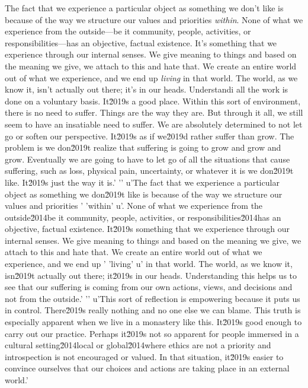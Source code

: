 The fact that we experience a particular object as something we don't 
like is because of the way we structure our values and priorities 
\emph{within}. None of what we experience from the outside---be it 
community, people, activities, or responsibilities---has an objective, 
factual existence. It's something that we experience through our 
internal senses. We give meaning to things and based on the meaning we 
give, we attach to this and hate that. We create an entire world out of 
what we experience, and we end up \emph{living} in that world. The 
world, as we know it, isn't actually out there; it's in our heads. 
Understandi all the work is done on a voluntary basis. It\u2019s a good place. Within this sort of environment, there is no need to suffer. Things are the way they are. But through it all, we still seem to have an insatiable need to suffer. We are absolutely determined to not let go or soften our perspective. It\u2019s as if we\u2019d rather suffer than grow. The problem is we don\u2019t realize that suffering is going to grow and grow and grow. Eventually we are going to have to let go of all the situations that cause suffering, such as loss, physical pain, uncertainty, or whatever it is we don\u2019t like. It\u2019s just the way it is.'
'\n'
u'The fact that we experience a particular object as something we don\u2019t like is because of the way we structure our values and priorities '
'within'
u'. None of what we experience from the outside\u2014be it community, people, activities, or responsibilities\u2014has an objective, factual existence. It\u2019s something that we experience through our internal senses. We give meaning to things and based on the meaning we give, we attach to this and hate that. We create an entire world out of what we experience, and we end up '
'living'
u' in that world. The world, as we know it, isn\u2019t actually out there; it\u2019s in our heads. Understanding this helps us to see that our suffering is coming from our own actions, views, and decisions and not from the outside.'
'\n'
u'This sort of reflection is empowering because it puts us in control. There\u2019s really nothing and no one else we can blame. This truth is especially apparent when we live in a monastery like this. It\u2019s good enough to carry out our practice. Perhaps it\u2019s not so apparent for people immersed in a cultural setting\u2014local or global\u2014where ethics are not a priority and introspection is not encouraged or valued. In that situation, it\u2019s easier to convince ourselves that our choices and actions are taking place in an external world.'
